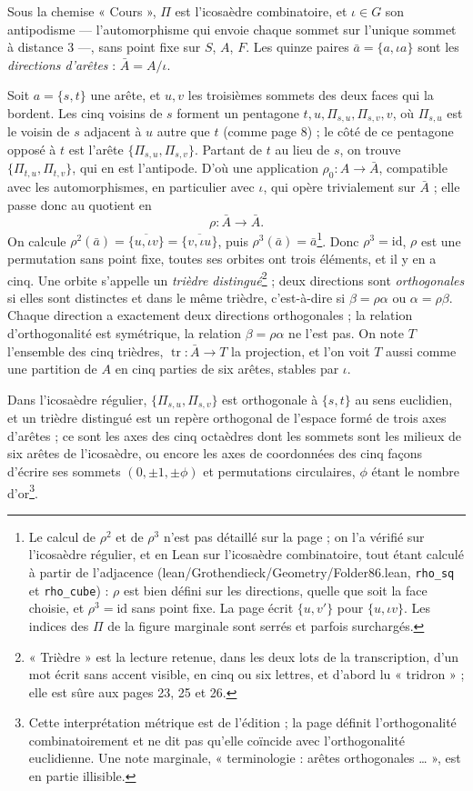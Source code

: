 \documentclass[11pt,a4paper]{article}
\begin{document}
Sous la chemise « Cours », $\Pi$ est l'icosaèdre combinatoire, et
$\iota \in G$ son antipodisme --- l'automorphisme qui envoie chaque sommet sur
l'unique sommet à distance $3$ ---, sans point fixe sur $S$, $A$, $F$. Les
quinze paires $\bar a = \{a, \iota a\}$ sont les \emph{directions d'arêtes} :
$\bar A = A/\iota$.

Soit $a = \{s, t\}$ une arête, et $u, v$ les troisièmes sommets des deux faces
qui la bordent. Les cinq voisins de $s$ forment un pentagone
$t, u, \Pi_{s,u}, \Pi_{s,v}, v$, où $\Pi_{s,u}$ est le voisin de $s$ adjacent
à $u$ autre que $t$ (comme page 8) ; le côté de ce pentagone opposé à $t$ est
l'arête $\{\Pi_{s,u}, \Pi_{s,v}\}$. Partant de $t$ au lieu de $s$, on trouve
$\{\Pi_{t,u}, \Pi_{t,v}\}$, qui en est l'antipode. D'où une application
$\rho_0 : A \to \bar A$, compatible avec les automorphismes, en particulier
avec $\iota$, qui opère trivialement sur $\bar A$ ; elle passe donc au quotient
en
\[
\rho : \bar A \longrightarrow \bar A .
\]
On calcule $\rho^2(\bar a) = \overline{\{u, \iota v\}} = \overline{\{v, \iota
u\}}$, puis $\rho^3(\bar a) = \bar a$\footnote{Le calcul de $\rho^2$ et de
$\rho^3$ n'est pas détaillé sur la page ; on l'a vérifié sur l'icosaèdre
régulier, et en Lean sur l'icosaèdre combinatoire, tout étant calculé à partir
de l'adjacence (lean/Grothendieck/Geometry/Folder86.lean, \texttt{rho\_sq} et
\texttt{rho\_cube}) : $\rho$ est bien défini sur les directions, quelle que
soit la face choisie, et $\rho^3 = \mathrm{id}$ sans point fixe. La page écrit $\{u, v'\}$ pour $\{u, \iota v\}$. Les indices des
$\Pi$ de la figure marginale sont serrés et parfois surchargés.}. Donc
$\rho^3 = \mathrm{id}$, $\rho$ est une permutation sans point fixe, toutes ses
orbites ont trois éléments, et il y en a cinq. Une orbite s'appelle un
\emph{trièdre distingué}\footnote{« Trièdre » est la lecture retenue, dans les
deux lots de la transcription, d'un mot écrit sans accent visible, en cinq ou
six lettres, et d'abord lu « tridron » ; elle est sûre aux pages 23, 25 et 26.} ;
deux directions sont \emph{orthogonales} si elles sont distinctes et dans le
même trièdre, c'est-à-dire si $\beta = \rho\alpha$ ou $\alpha = \rho\beta$.
Chaque direction a exactement deux directions orthogonales ; la relation
d'orthogonalité est symétrique, la relation $\beta = \rho\alpha$ ne l'est pas.
On note $T$ l'ensemble des cinq trièdres, $\operatorname{tr} : \bar A \to T$
la projection, et l'on voit $T$ aussi comme une partition de $A$ en cinq parties
de six arêtes, stables par $\iota$.

Dans l'icosaèdre régulier, $\{\Pi_{s,u}, \Pi_{s,v}\}$ est orthogonale à
$\{s, t\}$ au sens euclidien, et un trièdre distingué est un repère orthogonal
de l'espace formé de trois axes d'arêtes ; ce sont les axes des cinq octaèdres
dont les sommets sont les milieux de six arêtes de l'icosaèdre, ou encore les axes de coordonnées des cinq façons
d'écrire ses sommets $(0, \pm 1, \pm \phi)$ et permutations circulaires, $\phi$
étant le nombre d'or\footnote{Cette interprétation métrique est de l'édition ;
la page définit l'orthogonalité combinatoirement et ne dit pas qu'elle
coïncide avec l'orthogonalité euclidienne. Une note marginale, « terminologie :
arêtes orthogonales … », est en partie illisible.}.
\end{document}
